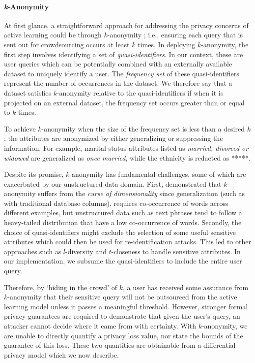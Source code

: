 \documentclass[letterpaper]{article}
\begin{document}
\paragraph{\textit{k}-Anonymity}
At first glance, a straightforward approach for addressing the privacy concerns of active learning could be through $k$-anonymity \cite{sweeney2002k,di2016enforcing}; i.e., ensuring each query that is sent out for crowdsourcing occurs at least $k$ times. In deploying $k$-anonymity, the first step involves identifying a set of \textit{quasi-identifiers}. In our context, these are user queries which can be potentially combined with an externally available dataset to uniquely identify a user. The \textit{frequency set} of these quasi-identifiers represent the number of occurrences in the dataset. We therefore say that a dataset satisfies $k$-anonymity relative to the quasi-identifiers if when it is projected on an external dataset, the frequency set occurs greater than or equal to $k$ times.


To achieve $k$-anonymity when the size of the frequency set is less than a desired \begin{math} k \end{math}, the attributes are anonymized by either generalizing or suppressing the information. For example, marital status attributes listed as \textit{married, divorced or widowed} are generalized as \textit{once married}, while the ethnicity is redacted as *****.


Despite its promise, $k$-anonymity has fundamental challenges, some of which are exacerbated by our unstructured data domain. First, \cite{aggarwal2005k} demonstrated that $k$-anonymity suffers from the \textit{curse of dimensionality} since generalization (such as with traditional database columns), requires co-occurrence of words across different examples, but unstructured data such as text phrases tend to follow a heavy-tailed distribution that have a low co-occurrence of words. Secondly, the choice of quasi-identifiers might exclude the selection of some useful sensitive attributes which could then be used for re-identification attacks. This led to other approaches such as $l$-diversity \cite{machanavajjhala2006diversity} and $t$-closeness \cite{li2007t} to handle sensitive attributes. In our implementation, we subsume the quasi-identifiers to include the entire user query.


Therefore, by `hiding in the crowd' of $k$, a user has received some assurance from $k$-anonymity that their sensitive query will not be outsourced from the active learning model unless it passes a meaningful threshold. However, stronger formal privacy guarantees are required to demonstrate that given the user's query, an attacker cannot decide where it came from with certainty. With $k$-anonymity, we are unable to directly quantify a privacy loss value, nor state the bounds of the guarantee of this loss. These two quantities are obtainable from a differential privacy model which we now describe.
\end{document}
